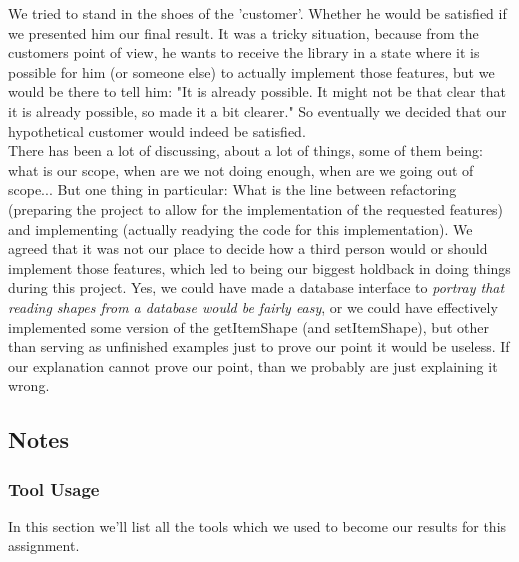 \documentclass{article}
\begin{document}
We tried to stand in the shoes of the 'customer'. Whether he would be satisfied if we presented him our final result. It was a tricky situation, because from the customers point of view, he wants to receive the library in a state where it is possible for him (or someone else) to actually implement those features, but we would be there to tell him: "It is already possible. It might not be that clear that it is already possible, so made it a bit clearer." So eventually we decided that our hypothetical customer would indeed be satisfied.\\

There has been a lot of discussing, about a lot of things, some of them being: what is our scope, when are we not doing enough, when are we going out of scope... But one thing in particular: What is the line between refactoring (preparing the project to allow for the implementation of the requested features) and implementing (actually readying the code for this implementation). We agreed that it was not our place to decide how a third person would or should implement those features, which led to being our biggest holdback in  doing things during this project. Yes, we could have made a database interface to \textit{portray that reading shapes from a database would be fairly easy}, or we could have effectively implemented some version of the getItemShape (and setItemShape), but other than serving as unfinished examples just to prove our point it would be useless. If our explanation cannot prove our point, than we probably are just explaining it wrong.\\

\subsection{Notes}

\subsubsection{Tool Usage}

In this section we'll list all the tools which we used to become our results for this assignment.
\end{document}
